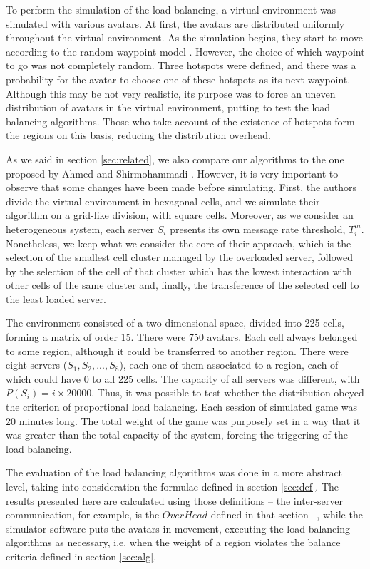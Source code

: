 To perform the simulation of the load balancing, a virtual environment was simulated with various avatars. At first, the avatars are distributed uniformly throughout the virtual environment. As the simulation begins, they start to move according to the random waypoint model \cite{bettstetter2004spr}. However, the choice of which waypoint to go was not completely random. Three hotspots were defined, and there was a probability for the avatar to choose one of these hotspots as its next waypoint. Although this may be not very realistic, its purpose was to force an uneven distribution of avatars in the virtual environment, putting to test the load balancing algorithms. Those who take account of the existence of hotspots form the regions on this basis, reducing the distribution overhead.

As we said in section \ref{sec:related}, we also compare our algorithms to the one proposed by Ahmed and Shirmohammadi \cite{ahmed2008mol}. However, it is very important to observe that some changes have been made before simulating. First, the authors divide the virtual environment in hexagonal cells, and we simulate their algorithm on a grid-like division, with square cells. Moreover, as we consider an heterogeneous system, each server $S_i$ presents its own message rate threshold, $T_i^m$.
%
Nonetheless, we keep what we consider the core of their approach, which is the selection of the smallest cell cluster managed by the overloaded server, followed by the selection of the cell of that cluster which has the lowest interaction with other cells of the same cluster and, finally, the transference of the selected cell to the least loaded server.

The environment consisted of a two-dimensional space, divided into 225 cells, forming a matrix of order 15. There were 750 avatars. Each cell always belonged to some region, although it could be transferred to another region. There were eight servers ($S_1, S_2, ..., S_8$), each one of them associated to a region, each of which could have 0 to all 225 cells. The capacity of all servers was different, with $P(S_i) = i \times 20000$. Thus, it was possible to test whether the distribution obeyed the criterion of proportional load balancing. Each session of simulated game was 20 minutes long. The total weight of the game was purposely set in a way that it was greater than the total capacity of the system, forcing the triggering of the load balancing.

The evaluation of the load balancing algorithms was done in a more abstract level, taking into consideration the formulae defined in section \ref{sec:def}. The results presented here are calculated using those definitions -- the inter-server communication, for example, is the $OverHead$ defined in that section --, while the simulator software puts the avatars in movement, executing the load balancing algorithms as necessary, i.e. when the weight of a region violates the balance criteria defined in section \ref{sec:alg}.

